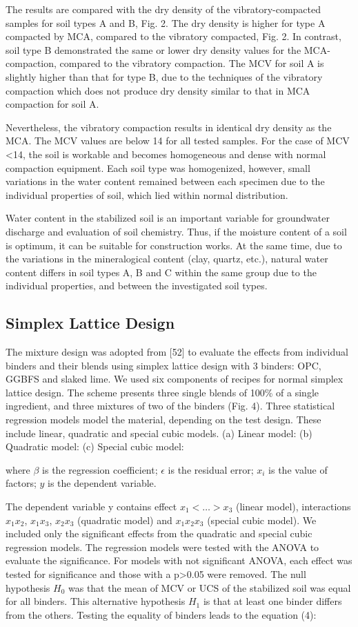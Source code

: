 \documentclass[electronics,article,submit,pdftex,moreauthors]{Definitions/mdpi}
\begin{document}
The results are compared with the dry density of the vibratory-compacted samples for soil types A and B, Fig. 2. The dry density is higher for type A compacted by MCA, compared to the vibratory compacted, Fig. 2. In contrast, soil type B demonstrated the same or lower dry density values for the MCA-compaction, compared to the vibratory compaction. The MCV for soil A is slightly higher than that for type B, due to the techniques of the vibratory compaction which does not produce dry density similar to that in MCA compaction for soil A. 

Nevertheless, the vibratory compaction results in identical dry density as the MCA. The MCV values are below 14 for all tested samples. For the case of MCV <14, the soil is workable and becomes homogeneous and dense with normal compaction equipment.  Each soil type was homogenized, however, small variations in the water content remained between each specimen due to the individual properties of soil, which lied within normal distribution.

Water content in the stabilized soil is an important variable for groundwater discharge and evaluation of soil chemistry. Thus, if the moisture content of a soil is optimum, it can be suitable for construction works. At the same time, due to the variations in the mineralogical content (clay, quartz, etc.), natural water content differs in soil types A, B and C within the same group due to the individual properties, and between the investigated soil types.  

\subsection{Simplex Lattice Design}
The mixture design was adopted from [52] to evaluate the effects from individual binders and their blends using simplex lattice design with 3 binders: OPC, GGBFS and slaked lime. We used six components of recipes for normal simplex lattice design. The scheme presents three single blends of 100\% of a single ingredient, and three mixtures of two of the binders (Fig. 4). Three statistical regression models model the material, depending on the test design. These include linear, quadratic and special cubic models. 
(a) Linear model:
(b) Quadratic model:
(c) Special cubic model:

where $\beta$ is the regression coefficient; $\epsilon$ is the residual error; $x_i$ is the value of factors; $y$ is the dependent variable.

The dependent variable y contains effect $x_1<\ldots>x_3$ (linear model), interactions $x_1x_2$, $x_1x_3$, $x_2x_3$ (quadratic model) and $x_1x_2x_3$ (special cubic model). We included only the significant effects from the quadratic and special cubic regression models. The regression models were tested with the ANOVA to evaluate the significance. For models with not significant ANOVA, each effect was tested for significance and those with a p>0.05 were removed.  The null hypothesis $H_0$ was that the mean of MCV or UCS of the stabilized soil was equal for all binders. This alternative hypothesis $H_1$ is that at least one binder differs from the others. Testing the equality of binders leads to the equation (4): 
\end{document}
